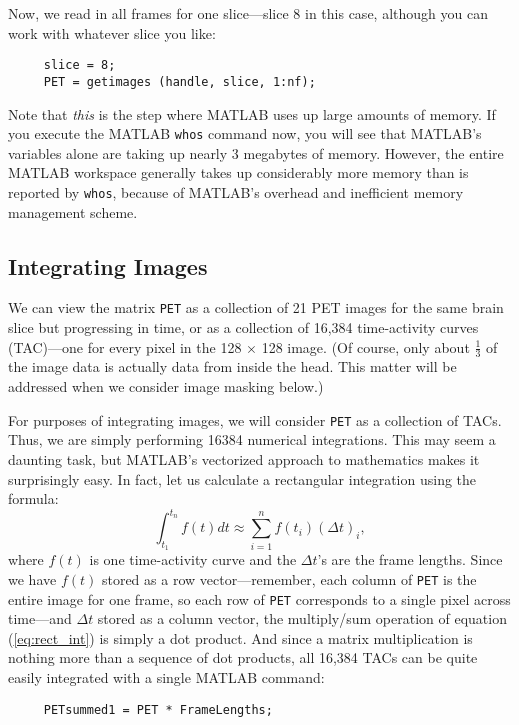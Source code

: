 Now, we read in all frames for one slice---slice 8 in this case,
although you can work with whatever slice you like:
\begin{verbatim}
     slice = 8;
     PET = getimages (handle, slice, 1:nf);
\end{verbatim}
Note that {\em this} is the step where MATLAB uses up large amounts of
memory.  If you execute the MATLAB \verb|whos| command now, you will
see that MATLAB's variables alone are taking up nearly 3 megabytes of
memory.  However, the entire MATLAB workspace generally takes up
considerably more memory than is reported by \verb|whos|, because of
MATLAB's overhead and inefficient memory management scheme.

\subsection{Integrating Images}

We can view the matrix \verb|PET| as a collection of 21 PET images
for the same brain slice but progressing in time, or as a collection
of 16,384 time-activity curves (TAC)---one for every pixel in the 128
$\times$ 128 image.  (Of course, only about $\frac{1}{3}$ of the
image data is actually data from inside the head.  This matter will
be addressed when we consider image masking below.)

For purposes of integrating images, we will consider \verb|PET| as a
collection of TACs.  Thus, we are simply performing 16384 numerical
integrations.  This may seem a daunting task, but MATLAB's vectorized
approach to mathematics makes it surprisingly easy.  In fact, let us
calculate a rectangular integration using the formula:
\begin{equation}
\int_{t_{1}}^{t_{n}} f(t) dt \approx \sum_{i=1}^{n} f(t_{i}) (\Delta t)_{i},
\label{eq:rect_int}
\end{equation}
where $f(t)$ is one time-activity curve and the $\Delta t$'s are the
frame lengths.  Since we have $f(t)$ stored as a row
vector---remember, each column of \verb|PET| is the entire image for
one frame, so each row of \verb|PET| corresponds to a single pixel
across time---and $\Delta t$ stored as a column vector, the
multiply/sum operation of equation (\ref{eq:rect_int}) is simply a
dot product.  And since a matrix multiplication is nothing more than
a sequence of dot products, all 16,384 TACs can be quite easily
integrated with a single MATLAB command:
\begin{verbatim}
     PETsummed1 = PET * FrameLengths;
\end{verbatim}


